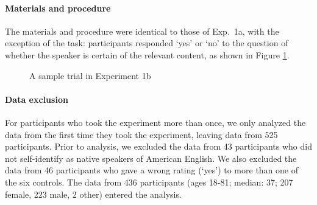 \documentclass[11pt,fleqn]{article}
\newcommand{\6}{\mbox{$[\hspace*{-.6mm}[$}}
\newcommand{\9}{\mbox{$]\hspace*{-.6mm}]$}}
\begin{document}
\paragraph{Materials and procedure} The materials and procedure were identical to those of Exp.~1a, with the exception of the task: participants responded `yes' or `no' to the question of whether the speaker is certain of the relevant content, as shown in Figure \ref{fig-trial-exp1b}.

\begin{figure}[h!]
\begin{center}
\end{center}
\caption{A sample trial in Experiment 1b}\label{fig-trial-exp1b}
\end{figure}

\paragraph{Data exclusion} For participants who took the experiment more than once, we only analyzed the data from the first time they took the experiment, leaving data from 525 participants. Prior to analysis, we excluded the data from 43 participants who did not self-identify as native speakers of American English. We also excluded the data from 46 participants who gave a wrong rating (`yes') to more than one of the six controls. The data from 436 participants (ages 18-81; median: 37; 207 female, 223 male, 2 other) entered the analysis. 
\end{document}
